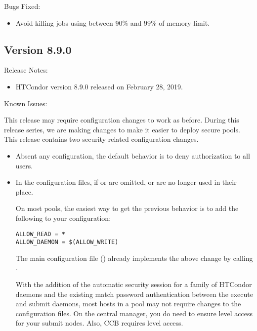 \noindent Bugs Fixed:

\begin{itemize}

\item Avoid killing jobs using between 90\% and 99\% of memory limit. 

\end{itemize}

\subsection*{\label{sec:New-8-9-0}Version 8.9.0}

\noindent Release Notes:

\begin{itemize}

\item HTCondor version 8.9.0 released on February 28, 2019.

\end{itemize}

\noindent Known Issues:

This release may require configuration changes to work as before.
During this release series, we are making changes to make it easier to deploy
secure pools. This release contains two security related configuration changes.

\begin{itemize}

\item Absent any configuration, the default behavior is to deny authorization
to all users.

\item In the configuration files, if  or
 are omitted,  or
 are no longer used in their place.

On most pools, the easiest way to get the previous behavior is to add the
following to your configuration:

\begin{verbatim}
ALLOW_READ = *
ALLOW_DAEMON = $(ALLOW_WRITE)
\end{verbatim}

The main configuration file () already
implements the above change by calling .

With the addition of the automatic security session for a family of HTCondor
daemons and the existing match password authentication between the execute
and submit daemons, most hosts in a pool may not require changes to the
configuration files.
On the central manager, you do need to ensure  level access
for your submit nodes.
Also, CCB requires  level access.

\end{itemize}

